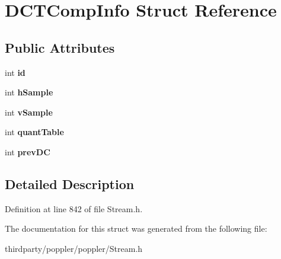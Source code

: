 \hypertarget{struct_d_c_t_comp_info}{}\section{D\+C\+T\+Comp\+Info Struct Reference}
\label{struct_d_c_t_comp_info}
\subsection*{Public Attributes}
\begin{DoxyCompactItemize}
\item 
\mbox{\label{struct_d_c_t_comp_info_a37b878008b2c4052d932cea6e5dd5a64}} 
int {\bfseries id}
\item 
\mbox{\label{struct_d_c_t_comp_info_a503fd4e66415178e4da67c01b86680ba}} 
int {\bfseries h\+Sample}
\item 
\mbox{\label{struct_d_c_t_comp_info_ac5e1c57161740d68456c5694c4a20b13}} 
int {\bfseries v\+Sample}
\item 
\mbox{\label{struct_d_c_t_comp_info_ae9413086e35a022b1161875314dc7e4c}} 
int {\bfseries quant\+Table}
\item 
\mbox{\label{struct_d_c_t_comp_info_a266d463ea7594c9ab9dbfb8ddb45c84a}} 
int {\bfseries prev\+DC}
\end{DoxyCompactItemize}


\subsection{Detailed Description}


Definition at line 842 of file Stream.\+h.



The documentation for this struct was generated from the following file\+:\begin{DoxyCompactItemize}
\item 
thirdparty/poppler/poppler/Stream.\+h\end{DoxyCompactItemize}
